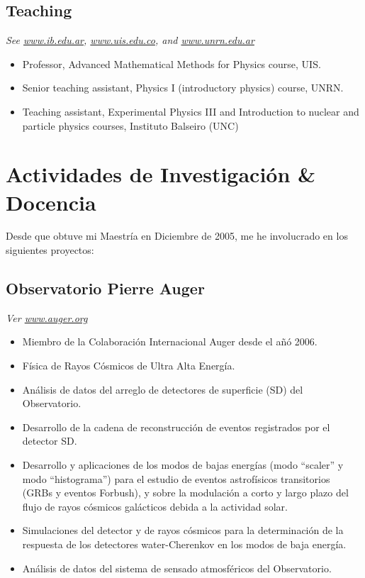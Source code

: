 \subsection*{Teaching}
{\small{\textit{See \href{http://www.ib.edu.ar}{www.ib.edu.ar}, \href{http://www.uis.edu.co}{www.uis.edu.co}, and \href{http://www.unrn.edu.ar}{www.unrn.edu.ar}}}}
\begin{itemize}
\item Professor, Advanced Mathematical Methods for Physics course, UIS.
\item Senior teaching assistant, Physics I (introductory physics) course, UNRN.
\item Teaching assistant, Experimental Physics III and Introduction to nuclear
and particle physics courses, Instituto Balseiro (UNC)
\end{itemize}
\else
\section*{Actividades de Investigación \& Docencia}

Desde que obtuve mi Maestría en Diciembre de 2005, me he involucrado en los siguientes proyectos:

\subsection*{Observatorio Pierre Auger}

{\small{\textit{Ver \href{http://www.auger.org/}{www.auger.org}}}}
\begin{itemize}
\item Miembro de la Colaboración Internacional Auger desde el añó 2006.
\item Física de Rayos Cósmicos de Ultra Alta Energía.
\item Análisis de datos del arreglo de detectores de superficie (SD) del Observatorio.
\item Desarrollo de la cadena de reconstrucción de eventos registrados por el detector SD.
\item Desarrollo y aplicaciones de los modos de bajas energías (modo ``scaler'' y modo ``histograma'') para el estudio de eventos astrofísicos transitorios (GRBs y eventos Forbush), y sobre la modulación a corto y largo plazo del flujo de rayos cósmicos galácticos debida a la actividad solar.
\item Simulaciones del detector y de rayos cósmicos para la determinación de la respuesta de los detectores water-Cherenkov en los modos de baja energía.
\item Análisis de datos del sistema de sensado atmosféricos del Observatorio.
\end{itemize}


